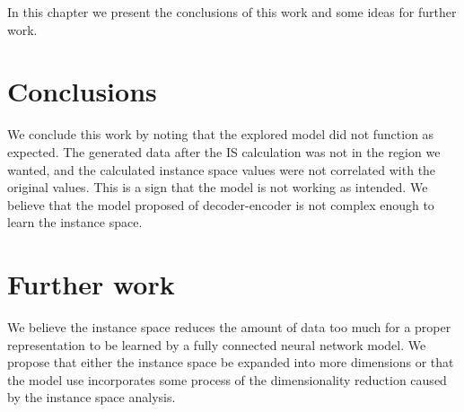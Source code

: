 In this chapter we present the conclusions of this work and some ideas for further work.

\section{Conclusions}

We conclude this work by noting that the explored model did not function as expected. The generated data after the IS calculation was not in the region we wanted, and the calculated instance space values were not correlated with the original values. This is a sign that the model is not working as intended. We believe that the model proposed of decoder-encoder is not complex enough to learn the instance space.

\section{Further work}

We believe the instance space reduces the amount of data too much for a proper representation to be learned by a fully connected neural network model. We propose that either the instance space be expanded into more dimensions or that the model use incorporates some process of the dimensionality reduction caused by the instance space analysis.